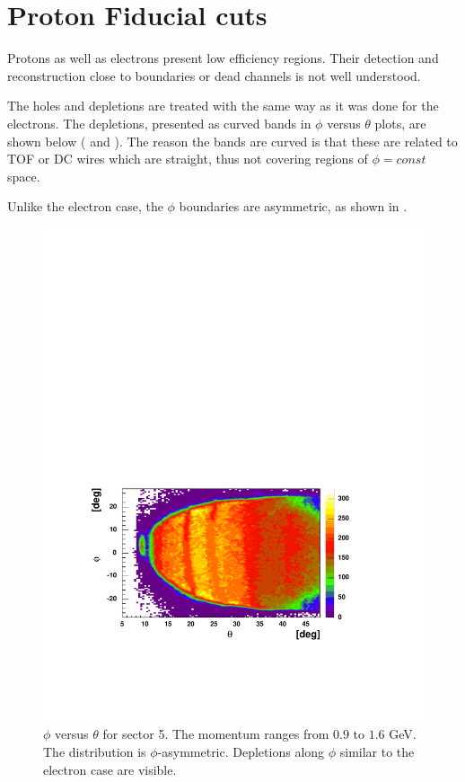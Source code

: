 \cia\vspace{-2cm}
\section{Proton Fiducial cuts} 
\label{sec:fid_p} 
Protons  as well as electrons present low efficiency regions. 
Their detection and reconstruction close to boundaries or dead 
channels is not well understood. 

The holes and depletions are treated with the same way as it was done for the electrons.
The depletions, presented as curved bands in $\phi$ versus $\theta$ plots, are shown below 
( and ).
The reason the bands are curved is that these are related to TOF or DC wires which are straight,
thus not covering regions of $\phi = const$ space.
 
Unlike the electron case, the $\phi$ boundaries are asymmetric, as shown in
.
\begin{figure}[h]
 \begin{center}
 \includegraphics[width = 13cm, bb=40 120 520 420]{data_reduction/img/proton_tph}  
  \caption[$\phi$ versus $\theta$ for sector 5 protons]
           { $\phi$ versus $\theta$ for sector 5. The momentum ranges from $0.9$ 
	              to $1.6$ GeV. The distribution is $\phi$-asymmetric.
                      Depletions along $\phi$ similar to the electron case are visible. }
 \label{fig:proton_tph}
 \end{center}
\end{figure}
